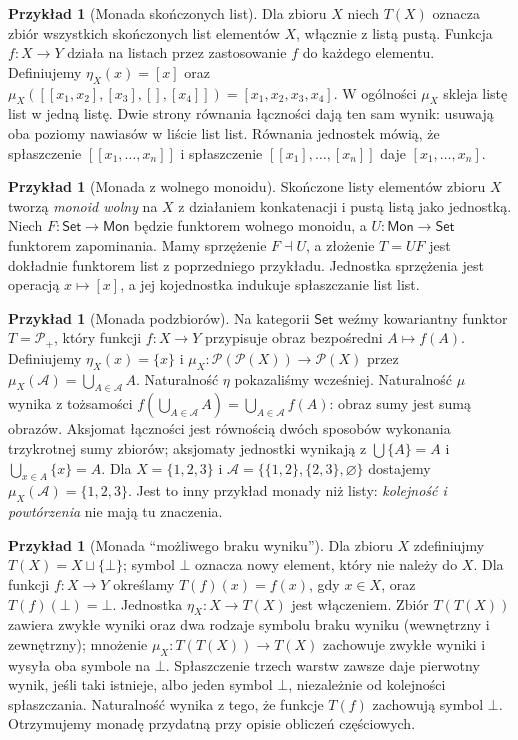 \documentclass[11pt,a4paper]{article}
\numberwithin{equation}{section}
\theoremstyle{plain}
\theoremstyle{definition}
\newtheorem{przyklad}[twierdzenie]{Przykład}
\theoremstyle{remark}
\newcommand{\cat}[1]{\mathsf{#1}}
\newcommand{\Set}{\cat{Set}}
\newcommand{\Mon}{\cat{Mon}}
\begin{document}
\begin{przyklad}[Monada skończonych list]\label{przyklad:list-monad}
Dla zbioru $X$ niech $T(X)$ oznacza zbiór wszystkich skończonych list elementów $X$, włącznie z listą pustą. Funkcja $f:X\to Y$ działa na listach przez zastosowanie $f$ do każdego elementu. Definiujemy $\eta_X(x)=[x]$ oraz $\mu_X([[x_1,x_2],[x_3],[],[x_4]])=[x_1,x_2,x_3,x_4]$. W ogólności $\mu_X$ skleja listę list w jedną listę. Dwie strony równania łączności dają ten sam wynik: usuwają oba poziomy nawiasów w liście list list. Równania jednostek mówią, że spłaszczenie $[[x_1,\ldots,x_n]]$ i spłaszczenie $[[x_1],\ldots,[x_n]]$ daje $[x_1,\ldots,x_n]$.
\end{przyklad}

\begin{przyklad}[Monada z wolnego monoidu]
Skończone listy elementów zbioru $X$ tworzą \emph{monoid wolny} na $X$ z działaniem konkatenacji i pustą listą jako jednostką. Niech $F:\Set\to\Mon$ będzie funktorem wolnego monoidu, a $U:\Mon\to\Set$ funktorem zapominania. Mamy sprzężenie $F\dashv U$, a złożenie $T=UF$ jest dokładnie funktorem list z poprzedniego przykładu. Jednostka sprzężenia jest operacją $x\mapsto[x]$, a jej kojednostka indukuje spłaszczanie list list.
\end{przyklad}


\begin{przyklad}[Monada podzbiorów]\label{przyklad:powerset-monad}
Na kategorii $\Set$ weźmy kowariantny funktor $T=\mathcal P_+$, który funkcji $f:X\to Y$ przypisuje obraz bezpośredni $A\mapsto f(A)$. Definiujemy $\eta_X(x)=\{x\}$ i $\mu_X:\mathcal P(\mathcal P(X))\to\mathcal P(X)$ przez $\mu_X(\mathscr A)=\bigcup_{A\in\mathscr A}A$. Naturalność $\eta$ pokazaliśmy wcześniej. Naturalność $\mu$ wynika z tożsamości $f(\bigcup_{A\in\mathscr A}A)=\bigcup_{A\in\mathscr A}f(A)$: obraz sumy jest sumą obrazów. Aksjomat łączności jest równością dwóch sposobów wykonania trzykrotnej sumy zbiorów; aksjomaty jednostki wynikają z $\bigcup\{A\}=A$ i $\bigcup_{x\in A}\{x\}=A$. Dla $X=\{1,2,3\}$ i $\mathscr A=\{\{1,2\},\{2,3\},\varnothing\}$ dostajemy $\mu_X(\mathscr A)=\{1,2,3\}$. Jest to inny przykład monady niż listy: \emph{kolejność i powtórzenia} nie mają tu znaczenia.
\end{przyklad}

\begin{przyklad}[Monada ``możliwego braku wyniku'']
Dla zbioru $X$ zdefiniujmy $T(X)=X\sqcup\{\bot\}$; symbol $\bot$ oznacza nowy element, który nie należy do $X$. Dla funkcji $f:X\to Y$ określamy $T(f)(x)=f(x)$, gdy $x\in X$, oraz $T(f)(\bot)=\bot$. Jednostka $\eta_X:X\to T(X)$ jest włączeniem. Zbiór $T(T(X))$ zawiera zwykłe wyniki oraz dwa rodzaje symbolu braku wyniku (wewnętrzny i zewnętrzny); mnożenie $\mu_X:T(T(X))\to T(X)$ zachowuje zwykłe wyniki i wysyła oba symbole na $\bot$. Spłaszczenie trzech warstw zawsze daje pierwotny wynik, jeśli taki istnieje, albo jeden symbol $\bot$, niezależnie od kolejności spłaszczania. Naturalność wynika z tego, że funkcje $T(f)$ zachowują symbol $\bot$. Otrzymujemy monadę przydatną przy opisie obliczeń częściowych.
\end{przyklad}
\end{document}
